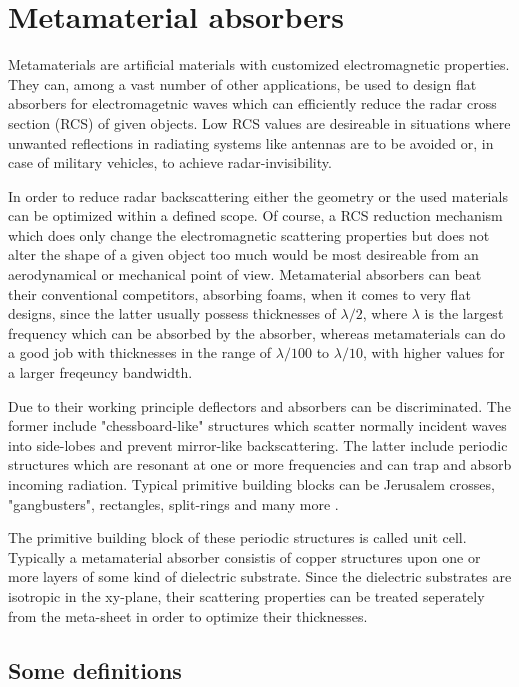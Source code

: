 \section{Metamaterial absorbers}
Metamaterials are artificial materials with customized electromagnetic properties. 
They can, among a vast number of other applications, be used to design flat absorbers for electromagetnic waves which can efficiently reduce the radar cross section (RCS) of given objects. Low RCS values are desireable in situations where unwanted reflections in radiating systems like antennas are to be avoided or, in case of military vehicles, to achieve radar-invisibility.

In order to reduce radar backscattering either the geometry or the used materials can be optimized within a defined scope. Of course, a RCS reduction mechanism which does only change the electromagnetic scattering properties but does not alter the shape of a given object too much would be most desireable from an aerodynamical or mechanical point of view. Metamaterial absorbers can beat their conventional competitors, absorbing foams, when it comes to very flat designs, since the latter usually possess thicknesses of $\lambda/2$, where $\lambda$ is the largest frequency which can be absorbed by the absorber, whereas metamaterials can do a good job with thicknesses in the range of $\lambda/100$ to $ \lambda/10$, with higher values for a larger freqeuncy bandwidth.

Due to their working principle deflectors and absorbers can be discriminated. The former include "chessboard-like" structures which scatter normally incident waves into side-lobes and prevent mirror-like backscattering. The latter include periodic structures which are resonant at one or more frequencies and can trap and absorb incoming radiation. Typical primitive building blocks can be Jerusalem crosses, "gangbusters", rectangles, split-rings and many more \cite{Munk2000}.

The primitive building block of these periodic structures is called unit cell. Typically a metamaterial absorber consistis of copper structures upon one or more layers of some kind of dielectric substrate. Since the dielectric substrates are isotropic in the xy-plane, their scattering properties can be treated seperately from the meta-sheet in order to optimize their thicknesses.

\subsection{Some definitions}

